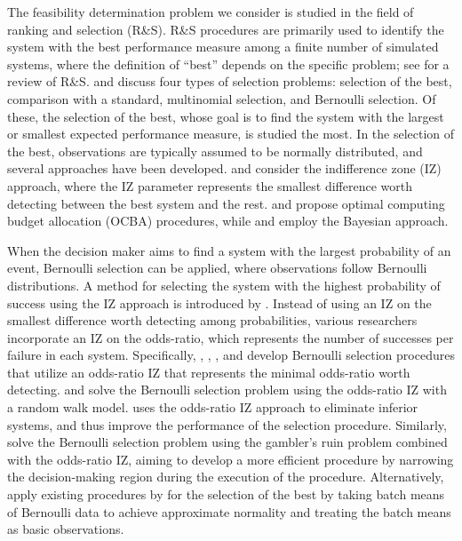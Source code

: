 \documentclass[11pt]{article}
\begin{document}
The feasibility determination problem we consider is studied in the field of ranking and selection (R\&S). R\&S procedures are primarily used to identify the system with the best performance measure among a finite number of simulated systems, where the definition of ``best'' depends on the specific problem; see \cite{Hong2021} for a review of R\&S. \cite{kim2006selecting} and \cite{Hong2015} discuss four types of selection problems: selection of the best, comparison with a standard, multinomial selection, and Bernoulli selection. Of these, the selection of the best, whose goal is to find the system with the largest or smallest expected performance measure, is studied the most. In the selection of the best, observations are typically assumed to be normally distributed, and several approaches have been developed. \cite{nelson2001simple} and \cite{KimNelson2001} consider the indifference zone (IZ) approach, where the IZ parameter represents the smallest difference worth detecting between the best system and the rest. \cite{chen2000simulation} and \cite{lee2010finding} propose optimal computing budget allocation (OCBA) procedures, while \cite{frazier2008knowledge} and \cite{XieFrazier2013} employ the Bayesian approach.  

When the decision maker aims to find a system with the largest probability of an event, Bernoulli selection can be applied, where observations follow Bernoulli distributions. A method for selecting the system with the highest probability of success using the IZ approach is introduced by \cite{sobel1957selecting}. Instead of using an IZ on the smallest difference worth detecting among probabilities, various researchers incorporate an IZ on the odds-ratio, which represents the number of successes per failure in each system. Specifically, \cite{bechhoferkiefersobel1968}, \cite{tamhane1985some}, \cite{paulson1994}, and \cite{wieland2004odds} develop Bernoulli selection procedures that utilize an odds-ratio IZ that represents the minimal odds-ratio worth detecting.
\cite{bechhoferkiefersobel1968} and \cite{tamhane1985some} solve the Bernoulli selection problem using the odds-ratio IZ with a random walk model. \cite{paulson1994} uses the odds-ratio IZ approach to eliminate inferior systems, and thus improve the performance of the selection procedure. Similarly, \cite{wieland2004odds} solve the Bernoulli selection problem using the gambler's ruin problem \citep{TaylorKarlin1994} combined with the odds-ratio IZ, aiming to develop a more efficient procedure by narrowing the decision-making region during the execution of the procedure. Alternatively, \cite{malone2005performance} apply existing procedures by \cite{KimNelson2001} for the selection of the best by taking batch means of Bernoulli data to achieve approximate normality and treating the batch means as basic observations.
\end{document}
